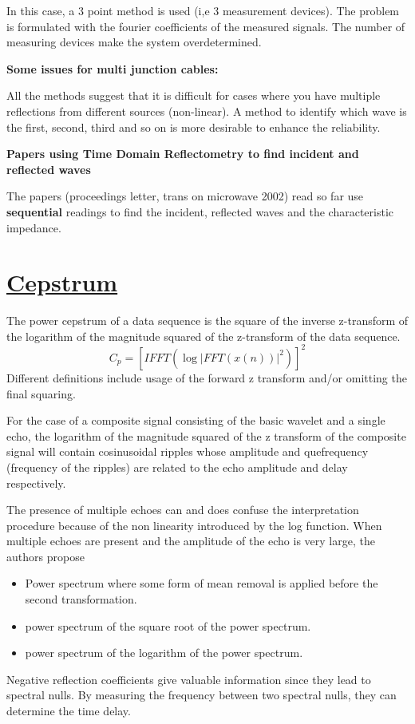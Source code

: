 \documentclass[12pt, a4paper]{report}
\newcommand{\record}[2]{\newpage\section*{\href{./library/#1.pdf}{#1}}\bibentry{#1}\fancyhf{}\lhead{#1}\rhead{#2}\par\bigbreak}
\begin{document}
In this case, a 3 point method is used (i,e 3 measurement devices). The problem is formulated with the fourier coefficients of the measured signals. The number of measuring devices make the system overdetermined.

\textbf{Some issues for multi junction cables:}

All the methods suggest that it is difficult for cases where you have multiple reflections from different sources (non-linear). A method to identify which wave is the first, second, third and so on is more desirable to enhance the reliability.

\textbf{Papers using Time Domain Reflectometry to find incident and reflected waves}

The papers (proceedings letter, trans on microwave 2002) read so far use \textbf{sequential} readings to find the incident, reflected waves and the characteristic impedance.
\record{Cepstrum}{}
The power cepstrum of a data sequence is the square of the inverse z-transform of the logarithm of the magnitude squared of the z-transform of the data sequence. 
\begin{equation}
	C_p = [IFFT(\log |FFT(x(n))|^2)]^2
\end{equation}
Different definitions include usage of the forward z transform and/or omitting the final squaring.

For the case of a composite signal consisting of the basic wavelet and a single echo, the logarithm of the magnitude squared of the z transform of the composite signal will contain cosinusoidal ripples whose amplitude and quefrequency (frequency of the ripples) are related to the echo amplitude and delay respectively.

The presence of multiple echoes can and does confuse the interpretation procedure because of the non linearity introduced by the log function. When multiple echoes are present and the amplitude of the echo is very large, the authors propose
\begin{itemize}
	\item Power spectrum where some form of mean removal is applied before the second transformation.\item power spectrum of the square root of the power spectrum.
	\item power spectrum of the logarithm of the power spectrum.
\end{itemize}
Negative reflection coefficients give valuable information since they lead to spectral nulls. By measuring the frequency between two spectral nulls, they can determine the time delay.
\end{document}
